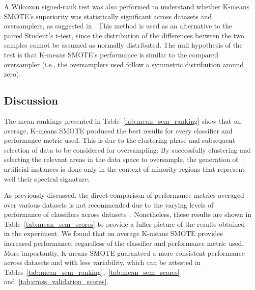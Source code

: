 \documentclass[preprint,12pt]{elsarticle}
\begin{document}
A Wilcoxon signed-rank test \cite{wilcoxon1992} was also performed to
understand whether K-means SMOTE's superiority was statistically significant
across datasets and oversamplers, as suggested in \cite{Demsar2006}. This
method is used as an alternative to the paired Student's t-test, since the
distribution of the differences between the two samples cannot be assumed as
normally distributed. The null hypothesis of the test is that K-means SMOTE's
performance is similar to the compared oversampler (i.e., the oversamplers
used follow a symmetric distribution around zero).

\begin{table}[H]
    \caption{
        \textit{p-values} of the Wilcoxon signed-rank test. Boldface values
        are statistically significant at a significance level of $\alpha =
        0.05$.
    \vspace{-.6cm}}\label{tab:wilcoxon_test}
\end{table}


\subsection{Discussion}

The mean rankings presented in Table~\ref{tab:mean_sem_ranking} show that on
average, K-means SMOTE produced the best results for every classifier and
performance metric used. This is due to the clustering phase and subsequent
selection of data to be considered for oversampling. By successfully
clustering and selecting the relevant areas in the data space to oversample,
the generation of artificial instances is done only in the context of minority
regions that represent well their spectral signature.

As previously discussed, the direct comparison of performance metrics averaged
over various datasets is not recommended due to the varying levels of
performance of classifiers across datasets~\cite{demvsar2006}. Nonetheless,
these results are shown in Table~\ref{tab:mean_sem_scores} to provide a fuller
picture of the results obtained in the experiment. We found that on average
K-means SMOTE provides increased performance, regardless of the classifier and
performance metric used. More importantly, K-means SMOTE guaranteed a more
consistent performance across datasets and with less variability, which can be
attested in Tables~\ref{tab:mean_sem_ranking},~\ref{tab:mean_sem_scores}
and~\ref{tab:cross_validation_scores}. 
\end{document}
